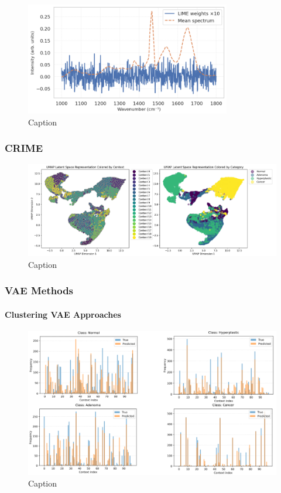 \begin{figure}[htbp]
  \centering
  \includegraphics[width=0.8\textwidth]{Images/lime_demo.png}
  \caption{Caption}
  \label{fig:my-label}
\end{figure}

\subsubsection{CRIME}
\begin{figure}[htbp]
  \centering
  \includegraphics[width=1\textwidth]{Images/crime_umap.png}
  \caption{Caption}
  \label{fig:my-label}
\end{figure}
\subsubsection{VAE Methods}
\paragraph{Clustering VAE Approaches}

\begin{figure}[htbp]
  \centering
  \includegraphics[width=1\textwidth]{Images/crime_groupings_by_category_100.png}
  \caption{Caption}
  \label{fig:my-label}
\end{figure}

